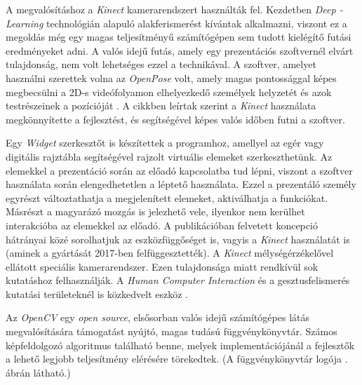 A megvalósításhoz a \textit{Kinect} kamerarendszert használták fel. Kezdetben \textit{Deep\- -Learning} technológián alapuló alakferismerést kívántak alkalmazni, viszont ez a megoldás még egy magas teljesítményű számítógépen sem tudott kielégítő futási eredményeket adni. A valós idejű futás, amely egy prezentációs szoftvernél elvárt tulajdonság, nem volt lehetséges ezzel a technikával. A szoftver, amelyet használni szerettek volna az \textit{OpenPose} volt, amely magas pontossággal képes megbecsülni a 2D-s videófolyamon elhelyezkedő személyek helyzetét és azok testrészeinek a pozícióját \cite{cao2018openpose}.
A cikkben leírtak szerint a \textit{Kinect} használata megkönnyítette a fejlesztést, és segítségével képes valós időben futni a szoftver.

Egy \textit{Widget} szerkesztőt is készítettek a programhoz, amellyel az egér vagy digitális rajztábla segítségével rajzolt virtuális elemeket szerkeszthetünk. Az elemekkel a prezentáció során az előadó kapcsolatba tud lépni, viszont a szoftver használata során elengedhetetlen a léptető használata. Ezzel a prezentáló személy egyrészt változtathatja a megjelenített elemeket, aktiválhatja a funkciókat. Másrészt a magyarázó mozgás is jelezhető vele, ilyenkor nem kerülhet interakcióba az elemekkel az előadó.
A publikációban felvetett koncepció hátrányai közé sorolhatjuk az eszközfüggőséget is, vagyis a \textit{Kinect} használatát is (aminek a gyártását 2017-ben felfüggesztették). A \textit{Kinect} mélységérzékelővel ellátott speciális kamerarendszer. Ezen tulajdonsága miatt rendkívül sok kutatáshoz felhasználják. A \textit{Human Computer Interaction} és a gesztusfelismerés kutatási területeknél is közkedvelt eszköz \cite{zhang2013new,tang2018structured}.



Az \textit{OpenCV} egy \textit{open source}, elsősorban valós idejű számítógépes látás megvalósítására támogatást nyújtó, magas tudású függvénykönyvtár. Számos képfeldolgozó algoritmus található benne, melyek implementációjánál a fejlesztők a lehető legjobb teljesítmény elérésére törekedtek. (A függvénykönyvtár logója . ábrán látható.)

